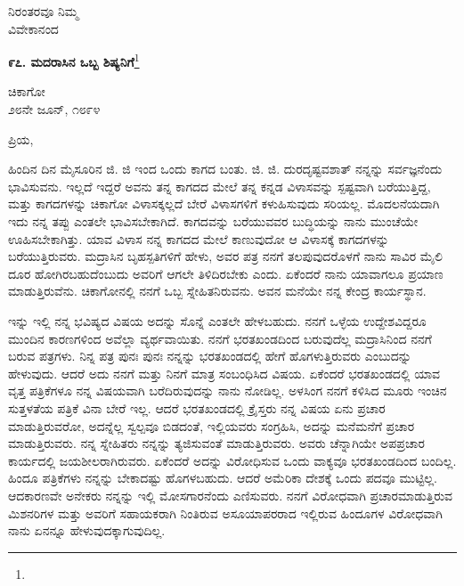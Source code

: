 {\flushright
ನಿರಂತರವೂ ನಿಮ್ಮ\\ವಿವೇಕಾನಂದ\par}
\vspace{-0.5cm}

\begin{center}
\textbf{೯೭. ಮದರಾಸಿನ ಒಬ್ಬ ಶಿಷ್ಯನಿಗೆ}\footnote{}
\end{center}
\vspace{-0.5cm}

\begin{flushright}
ಚಿಕಾಗೋ\\೨೮ನೇ ಜೂನ್, ೧೮೯೪
\end{flushright}
\vspace{-0.5cm}

\noindent
ಪ್ರಿಯ,

ಹಿಂದಿನ ದಿನ ಮೈಸೂರಿನ ಜಿ. ಜಿ ಇಂದ ಒಂದು ಕಾಗದ ಬಂತು. ಜಿ. ಜಿ. ದುರದೃಷ್ಟವಶಾತ್ ನನ್ನನ್ನು ಸರ್ವಜ್ಞನೆಂದು ಭಾವಿಸುವನು. ಇಲ್ಲದೆ ಇದ್ದರೆ ಅವನು ತನ್ನ ಕಾಗದದ ಮೇಲೆ ತನ್ನ ಕನ್ನಡ ವಿಳಾಸವನ್ನು ಸ್ಪಷ್ಟವಾಗಿ ಬರೆಯುತ್ತಿದ್ದ, ಮತ್ತು ಕಾಗದಗಳನ್ನು ಚಿಕಾಗೋ ವಿಳಾಸಕ್ಕಲ್ಲದೆ ಬೇರೆ ವಿಳಾಸಗಳಿಗೆ ಕಳುಹಿಸುವುದು ಸರಿಯಲ್ಲ. ಮೊದಲನೆಯದಾಗಿ ಇದು ನನ್ನ ತಪ್ಪು ಎಂತಲೇ ಭಾವಿಸಬೇಕಾಗಿದೆ. ಕಾಗದವನ್ನು ಬರೆಯುವವರ ಬುದ್ಧಿಯನ್ನು ನಾನು ಮುಂಚೆಯೇ ಊಹಿಸಬೇಕಾಗಿತ್ತು. ಯಾವ ವಿಳಾಸ ನನ್ನ ಕಾಗದದ ಮೇಲೆ ಕಾಣುವುದೋ ಆ ವಿಳಾಸಕ್ಕೆ ಕಾಗದಗಳನ್ನು ಬರೆಯುತ್ತಿರುವರು. ಮದ್ರಾಸಿನ ಬೃಹಸ್ಪತಿಗಳಿಗೆ ಹೇಳು, ಅವರ ಪತ್ರ ನನಗೆ ತಲಪುವುದರೊಳಗೆ ನಾನು ಸಾವಿರ ಮೈಲಿ ದೂರ ಹೋಗಿರಬಹುದೆಂಬುದು ಅವರಿಗೆ ಆಗಲೇ ತಿಳಿದಿರಬೇಕು ಎಂದು. ಏಕೆಂದರೆ ನಾನು ಯಾವಾಗಲೂ ಪ್ರಯಾಣ ಮಾಡುತ್ತಿರುವೆನು. ಚಿಕಾಗೋನಲ್ಲಿ ನನಗೆ ಒಬ್ಬ ಸ್ನೇಹಿತನಿರುವನು. ಅವನ ಮನೆಯೇ ನನ್ನ ಕೇಂದ್ರ ಕಾರ್ಯಸ್ಥಾನ.

ಇನ್ನು ಇಲ್ಲಿ ನನ್ನ ಭವಿಷ್ಯದ ವಿಷಯ \enginline{-} ಅದನ್ನು ಸೊನ್ನೆ ಎಂತಲೇ ಹೇಳಬಹುದು. ನನಗೆ ಒಳ್ಳೆಯ ಉದ್ದೇಶವಿದ್ದರೂ ಮುಂದಿನ ಕಾರಣಗಳಿಂದ ಅವೆಲ್ಲಾ ವ್ಯರ್ಥವಾಯಿತು. ನನಗೆ ಭರತಖಂಡದಿಂದ ಬರುವುದೆಲ್ಲ ಮದ್ರಾಸಿನಿಂದ ನನಗೆ ಬರುವ ಪತ್ರಗಳು. ನಿನ್ನ ಪತ್ರ ಪುನಃ ಪುನಃ ನನ್ನನ್ನು ಭರತಖಂಡದಲ್ಲಿ ಹೇಗೆ ಹೊಗಳುತ್ತಿರುವರು ಎಂಬುದನ್ನು ಹೇಳುವುದು. ಆದರೆ ಅದು ನನಗೆ ಮತ್ತು ನಿನಗೆ ಮಾತ್ರ ಸಂಬಂಧಿಸಿದ ವಿಷಯ. ಏಕೆಂದರೆ ಭರತಖಂಡದಲ್ಲಿ ಯಾವ ವೃತ್ತ ಪತ್ರಿಕೆಗಳೂ ನನ್ನ ವಿಷಯವಾಗಿ ಬರೆದಿರುವುದನ್ನು ನಾನು ನೋಡಿಲ್ಲ. ಅಳಸಿಂಗ ನನಗೆ ಕಳಿಸಿದ ಮೂರು ಇಂಚಿನ ಸುತ್ತಳತೆಯ ಪತ್ರಿಕೆ ವಿನಾ ಬೇರೆ ಇಲ್ಲ. ಆದರೆ ಭರತಖಂಡದಲ್ಲಿ ಕ್ರೈಸ್ತರು ನನ್ನ ವಿಷಯ ಏನು ಪ್ರಚಾರ ಮಾಡುತ್ತಿರುವರೋ, ಅದನ್ನೆಲ್ಲ ಸ್ವಲ್ಪವೂ ಬಿಡದಂತೆ, ಇಲ್ಲಿಯವರು ಸಂಗ್ರಹಿಸಿ, ಅದನ್ನು ಮನೆಮನೆಗೆ ಪ್ರಚಾರ ಮಾಡುತ್ತಿರುವರು. ನನ್ನ ಸ್ನೇಹಿತರು ನನ್ನನ್ನು ತ್ಯಜಿಸುವಂತೆ ಮಾಡುತ್ತಿರುವರು. ಅವರು ಚೆನ್ನಾಗಿಯೇ ಅಪಪ್ರಚಾರ ಕಾರ್ಯದಲ್ಲಿ ಜಯಶೀಲರಾಗಿರುವರು. ಏಕೆಂದರೆ ಅದನ್ನು ವಿರೋಧಿಸುವ ಒಂದು ವಾಕ್ಯವೂ ಭರತಖಂಡದಿಂದ ಬಂದಿಲ್ಲ. ಹಿಂದೂ ಪತ್ರಿಕೆಗಳು ನನ್ನನ್ನು ಬೇಕಾದಷ್ಟು ಹೊಗಳಬಹುದು. ಆದರೆ ಅಮೆರಿಕಾ ದೇಶಕ್ಕೆ ಒಂದು ಪದವೂ ಮುಟ್ಟಿಲ್ಲ. ಆದಕಾರಣವೇ ಅನೇಕರು ನನ್ನನ್ನು ಇಲ್ಲಿ ಮೋಸಗಾರನೆಂದು ಎಣಿಸುವರು. ನನಗೆ ವಿರೋಧವಾಗಿ ಪ್ರಚಾರಮಾಡುತ್ತಿರುವ ಮಿಶನರಿಗಳ ಮತ್ತು ಅವರಿಗೆ ಸಹಾಯಕರಾಗಿ ನಿಂತಿರುವ ಅಸೂಯಾಪರರಾದ ಇಲ್ಲಿರುವ ಹಿಂದೂಗಳ ವಿರೋಧವಾಗಿ ನಾನು ಏನನ್ನೂ ಹೇಳುವುದಕ್ಕಾಗುವುದಿಲ್ಲ.

